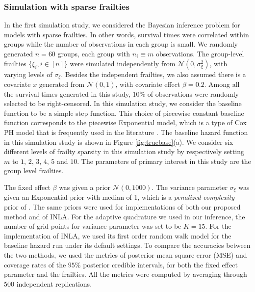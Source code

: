 \documentclass[ba]{imsart}
\begin{document}
\subsubsection{Simulation with sparse frailties}\label{subsubsec:sim1}

In the first simulation study, we considered the Bayesian inference problem for models with sparse frailties. In other words, survival times were correlated within groups while the number of observations in each group is small. We randomly generated $n = 60$ groups, each group with $n_i \equiv m$ observations. The group-level frailties $\{\xi_i, i\in [n] \}$ were simulated independently from $\mathcal{N}(0,\sigma_\xi^{2})$, with varying levels of $\sigma_{\xi}$. Besides the independent frailties, we also assumed there is a covariate $x$ generated from $\mathcal{N}(0,1)$, with covariate effect $\beta = 0.2$. Among all the survival times generated in this study, $10\%$ of observations were randomly selected to be right-censored. In this simulation study, we consider the baseline function to be a simple step function. This choice of piecewise constant baseline function corresponds to the piecewise Exponential model, which is a type of Cox PH model that is frequently used in the literature \citep{piecewiseExp}.
The baseline hazard function in this simulation study is shown in Figure \ref{fig:truebase}(a). We consider six different levels of frailty sparsity in this simulation study by respectively setting $m$ to $1$, $2$, $3$, $4$, $5$ and $10$. The parameters of primary interest in this study are the group level frailties.

The fixed effect $\beta$ was given a prior $\mathcal{N}(0,1000)$. The variance parameter $\sigma_\xi$ was given an Exponential prior with median of 1, which is a \emph{penalized complexity} prior of \cite{pcprior}. The same priors were used for implementations of both our proposed method and of INLA. For the adaptive quadrature we used in our inference, the number of grid points for variance parameter was set to be $K = 15$. For the implementation of INLA, we used its first order random walk model for the baseline hazard run under its default settings. To compare the accuracies between the two methods, we used the metrics of posterior mean square error (MSE) and coverage rates of the $95\%$ posterior credible intervals, for both the fixed effect parameter and the frailties. All the metrics were computed by averaging through 500 independent replications.
\end{document}
